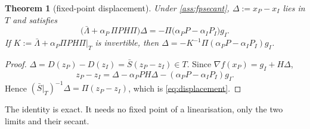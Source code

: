 \documentclass[11pt]{article}
\newtheorem{theorem}{Theorem}[section]
\theoremstyle{definition}
\theoremstyle{remark}
\begin{document}
\begin{theorem}[fixed-point displacement]\label{thm:displacement}
Under \cref{ass:fpsecant}, $\Delta:=x_P-x_I$ lies in $T$ and satisfies
\begin{equation}\label{eq:displacement}
  \big(\bar\Lambda+\alpha_P\,\Pi PH\Pi\big)\Delta=-\Pi\big(\alpha_PP-\alpha_IP_I\big)g_I .
\end{equation}
If $K:=\bar\Lambda+\alpha_P\Pi PH\Pi|_T$ is invertible, then $\Delta=-K^{-1}\Pi(\alpha_PP-\alpha_IP_I)g_I$.
\end{theorem}
\begin{proof}
$\Delta=D(z_P)-D(z_I)=\bar S(z_P-z_I)\in T$. Since $\nabla f(x_P)=g_I+H\Delta$,
\[
z_P-z_I=\Delta-\alpha_PPH\Delta-(\alpha_PP-\alpha_IP_I)g_I .
\]
Hence $(\bar S|_T)^{-1}\Delta=\Pi(z_P-z_I)$, which is \eqref{eq:displacement}.
\end{proof}

The identity is exact. It needs no fixed point of a linearisation, only the two limits and their secant.
\end{document}
